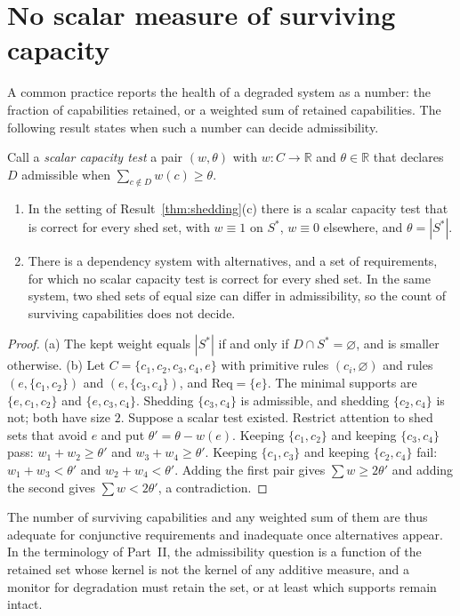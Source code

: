 \section{No scalar measure of surviving capacity}

A common practice reports the health of a degraded system as a number: the fraction of capabilities retained, or a weighted sum of retained capabilities. The following result states when such a number can decide admissibility.

\begin{newresult}\label{prop:scalar}
Call a \emph{scalar capacity test} a pair $(w,\theta)$ with $w:C\to\mathbb R$ and $\theta\in\mathbb R$ that declares $D$ admissible when $\sum_{c\notin D}w(c)\ge\theta$.
\begin{enumerate}[nosep,label=(\alph*)]
  \item In the setting of Result~\ref{thm:shedding}(c) there is a scalar capacity test that is correct for every shed set, with $w\equiv1$ on $S^{*}$, $w\equiv0$ elsewhere, and $\theta=|S^{*}|$.
  \item There is a dependency system with alternatives, and a set of requirements, for which no scalar capacity test is correct for every shed set. In the same system, two shed sets of equal size can differ in admissibility, so the count of surviving capabilities does not decide.
\end{enumerate}
\end{newresult}
\begin{proof}
(a) The kept weight equals $|S^{*}|$ if and only if $D\cap S^{*}=\varnothing$, and is smaller otherwise. (b) Let $C=\{c_1,c_2,c_3,c_4,e\}$ with primitive rules $(c_i,\varnothing)$ and rules $(e,\{c_1,c_2\})$ and $(e,\{c_3,c_4\})$, and $\mathrm{Req}=\{e\}$. The minimal supports are $\{e,c_1,c_2\}$ and $\{e,c_3,c_4\}$. Shedding $\{c_3,c_4\}$ is admissible, and shedding $\{c_2,c_4\}$ is not; both have size $2$. Suppose a scalar test existed. Restrict attention to shed sets that avoid $e$ and put $\theta'=\theta-w(e)$. Keeping $\{c_1,c_2\}$ and keeping $\{c_3,c_4\}$ pass: $w_1+w_2\ge\theta'$ and $w_3+w_4\ge\theta'$. Keeping $\{c_1,c_3\}$ and keeping $\{c_2,c_4\}$ fail: $w_1+w_3<\theta'$ and $w_2+w_4<\theta'$. Adding the first pair gives $\sum w\ge2\theta'$ and adding the second gives $\sum w<2\theta'$, a contradiction.
\end{proof}

The number of surviving capabilities and any weighted sum of them are thus adequate for conjunctive requirements and inadequate once alternatives appear. In the terminology of Part~II, the admissibility question is a function of the retained set whose kernel is not the kernel of any additive measure, and a monitor for degradation must retain the set, or at least which supports remain intact.

